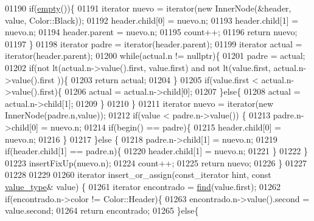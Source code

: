 \begin{DoxyCode}
01190         \textcolor{keywordflow}{if}(\hyperlink{classaed2_1_1map_af5320ca0a7df4d16015441d5d055a7ee_af5320ca0a7df4d16015441d5d055a7ee}{empty}())\{
01191             iterator nuevo = iterator(\textcolor{keyword}{new} InnerNode(&header, value, Color::Black));
01192             header.child[0] = nuevo.n;
01193             header.child[1] = nuevo.n;
01194             header.parent = nuevo.n;
01195             count++;
01196             \textcolor{keywordflow}{return} nuevo;
01197         \}
01198         iterator padre = iterator(header.parent);
01199         iterator actual = iterator(header.parent);
01200         \textcolor{keywordflow}{while}(actual.n != \textcolor{keyword}{nullptr})\{
01201             padre = actual;
01202             \textcolor{keywordflow}{if}(not lt(actual.n->value().first, value.first) and not lt(value.first, actual.n->value().first
      ))\{
01203                 \textcolor{keywordflow}{return} actual;
01204             \}
01205             \textcolor{keywordflow}{if}(value.first < actual.n->value().first)\{
01206                 actual = actual.n->child[0];
01207             \}\textcolor{keywordflow}{else}\{
01208                 actual = actual.n->child[1];
01209             \}
01210         \}
01211         iterator nuevo = iterator(\textcolor{keyword}{new} InnerNode(padre.n,value));
01212         \textcolor{keywordflow}{if}(value < padre.n->value()) \{
01213             padre.n->child[0] = nuevo.n;
01214             \textcolor{keywordflow}{if}(begin() == padre)\{
01215                 header.child[0] = nuevo.n;
01216             \}
01217         \}\textcolor{keywordflow}{else} \{
01218             padre.n->child[1] = nuevo.n;
01219             \textcolor{keywordflow}{if}(header.child[1] == padre.n)\{
01220                 header.child[1] = nuevo.n;
01221             \}
01222         \}
01223         insertFixUp(nuevo.n);
01224         count++;
01225         \textcolor{keywordflow}{return} nuevo;
01226     \}
01227 
01228 
01229 
01260     iterator insert\_or\_assign(const\_iterator hint, \textcolor{keyword}{const} \hyperlink{classaed2_1_1map_a719db98e0ff9a837610f76be33264680_a719db98e0ff9a837610f76be33264680}{value\_type}& value) \{
01261         iterator encontrado = \hyperlink{classaed2_1_1map_afd0fc1a8234888e61e0e615de7e245b8_afd0fc1a8234888e61e0e615de7e245b8}{find}(value.first);
01262         \textcolor{keywordflow}{if}(encontrado.n->color != Color::Header)\{
01263             encontrado.n->value().second = value.second;
01264             \textcolor{keywordflow}{return} encontrado;
01265         \}\textcolor{keywordflow}{else}\{

\end{DoxyCode}
